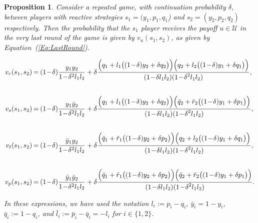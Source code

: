 \documentclass[11pt]{article}
\theoremstyle{plainCl1}
\newtheorem{Prop}{Proposition}
\theoremstyle{plainCl2}
\begin{document}
\begin{Prop}\label{proposition:last_round} Consider a repeated game, with
continuation probability $\delta$, between players with reactive strategies
$s_1\!=\!(y_1, p_1, q_1$)  and $s_2\!=\!(y_2,p_2,q_2)$ respectively. Then
the probability that the $s_1$ player receives the payoff $u\!\in\!
\mathcal{U}$ in the very last round of the game is given by
$v_{u}(s_1,s_2)$, as given by Equation~(\ref{Eq:LastRound}).

\begin{equation} \label{Eq:LastRound}
  \setlength{\arraycolsep}{1pt}
  \begin{array}{rcl}

  v_{r}(s_1,s_2) &= &\displaystyle (1\!-\!\delta)\frac{y_1y_2}{1\!-\!\delta^2 l_1 l_2}+\delta \frac{\Big(q_1+l_1\big((1\!-\!\delta)y_2+\delta q_2\big)\Big) \Big(q_2+l_2\big((1\!-\!\delta)y_1+\delta q_1\big)\Big)}
  {\displaystyle(1\!-\!\delta l_1l_2)(1\!-\!\delta^2 l_1 l_2)},\\[1cm]

  v_{s}(s_1,s_2) &= &\displaystyle (1\!-\!\delta)\frac{y_1\bar{y}_2}{1\!-\!\delta^2 l_1 l_2}+\delta \frac{\Big(q_1+l_1\big((1\!-\!\delta)y_2+\delta q_2\big)\Big) \Big(\bar{q}_2+\bar{r}_2\big((1\!-\!\delta)y_1+\delta p_1\big)\Big)}
  {\displaystyle(1\!-\!\delta l_1l_2)(1\!-\!\delta^2 l_1 l_2)},\\[1cm]

  v_{t}(s_1,s_2) &= &\displaystyle (1\!-\!\delta)\frac{\bar{y}_1y_2}{1\!-\!\delta^2 l_1 l_2}+\delta \frac{\Big(\bar{q}_1+\bar{r}_1\big((1\!-\!\delta)y_2+\delta p_2\big)\Big) \Big(q_2+l_2\big((1\!-\!\delta)y_1+\delta q_1\big)\Big)}
  {\displaystyle(1\!-\!\delta l_1l_2)(1\!-\!\delta^2 l_1 l_2)},\\[1cm]

  v_{p}(s_1,s_2) &= &\displaystyle (1\!-\!\delta)\frac{\bar{y}_1\bar{y}_2}{1\!-\!\delta^2 l_1 l_2}+\delta \frac{\Big(\bar{q}_1+\bar{r}_1\big((1\!-\!\delta)y_2+\delta p_2\big)\Big) \Big(\bar{q}_2+\bar{r}_2\big((1\!-\!\delta)y_1+\delta p_1\big)\Big)}
  {\displaystyle(1\!-\!\delta l_1l_2)(1\!-\!\delta^2 l_1 l_2)}.
  \end{array}
\end{equation}

In these expressions, we have used the notation $l_i:=p_i\!-\!q_i$,
$\bar{y}_i\!=\!1\!-\!y_i$, $\bar{q}_i:=1\!-\!q_i$, and
$\bar{l}_i:=\bar{p}_i\!-\!\bar{q}_i=-l_i$ for $i\!\in\!\{1,2\}$.
\end{Prop}
\end{document}
